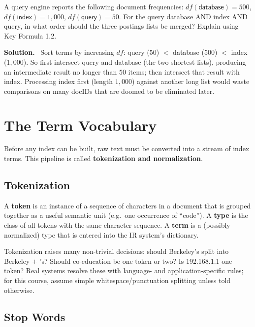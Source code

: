 \documentclass[11pt, a4paper]{article}
\newcommand{\Solution}{\medskip\noindent\textbf{\color{exgreen}Solution.}\ }
\begin{document}
\begin{exercisebox}
A query engine reports the following document frequencies: $df(\textsf{database})=500$, $df(\textsf{index})=1{,}000$, $df(\textsf{query})=50$. For the query \textsf{database AND index AND query}, in what order should the three postings lists be merged? Explain using Key Formula 1.2.
\end{exercisebox}

\Solution
Sort terms by increasing $df$: \textsf{query} ($50$) $<$ \textsf{database} ($500$) $<$ \textsf{index} ($1{,}000$). So first intersect \textsf{query} and \textsf{database} (the two shortest lists), producing an intermediate result no longer than $50$ items; then intersect that result with \textsf{index}. Processing \textsf{index} first (length $1{,}000$) against another long list would waste comparisons on many docIDs that are doomed to be eliminated later.

\section{The Term Vocabulary}

Before any index can be built, raw text must be converted into a stream of index terms. This pipeline is called \textbf{tokenization and normalization}.

\subsection{Tokenization}

\begin{defbox}
A \textbf{token} is an instance of a sequence of characters in a document that is grouped together as a useful semantic unit (e.g.\ one occurrence of ``code''). A \textbf{type} is the class of all tokens with the same character sequence. A \textbf{term} is a (possibly normalized) type that is entered into the IR system's dictionary.
\end{defbox}

Tokenization raises many non-trivial decisions: should \textsf{Berkeley's} split into \textsf{Berkeley} $+$ \textsf{'s}? Should \textsf{co-education} be one token or two? Is \textsf{192.168.1.1} one token? Real systems resolve these with language- and application-specific rules; for this course, assume simple whitespace/punctuation splitting unless told otherwise.

\subsection{Stop Words}
\end{document}
